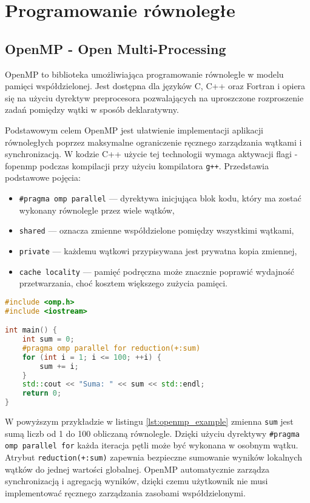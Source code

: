 \section{Programowanie równoległe}
\subsection{OpenMP -  Open Multi-Processing}
OpenMP to biblioteka umożliwiająca programowanie równoległe w modelu pamięci współdzielonej. Jest dostępna dla języków C, C++ oraz Fortran i opiera się na użyciu dyrektyw preprocesora pozwalających na uproszczone rozproszenie zadań pomiędzy wątki w sposób deklaratywny.

Podstawowym celem OpenMP jest ułatwienie implementacji aplikacji równoległych poprzez maksymalne ograniczenie ręcznego zarządzania wątkami i synchronizacją. W kodzie C++ użycie tej technologii wymaga aktywacji flagi -fopenmp podczas kompilacji przy użyciu kompilatora \texttt{g++}.
Przedstawia podstawowe pojęcia:
\begin{itemize}
    \item \texttt{\#pragma omp parallel} — dyrektywa inicjująca blok kodu, który ma zostać wykonany równolegle przez wiele wątków,
    \item \texttt{shared} — oznacza zmienne współdzielone pomiędzy wszystkimi wątkami,
    \item \texttt{private} — każdemu wątkowi przypisywana jest prywatna kopia zmiennej,
    \item \texttt{cache locality} — pamięć podręczna  może znacznie poprawić wydajność przetwarzania, choć kosztem większego zużycia pamięci.
\end{itemize}

\begin{lstlisting}[language=C++, style=VS2017,  caption={Przykład użycia OpenMP w C++}, label={lst:openmp_example}]
#include <omp.h>
#include <iostream>

int main() {
    int sum = 0;
    #pragma omp parallel for reduction(+:sum)
    for (int i = 1; i <= 100; ++i) {
        sum += i;
    }
    std::cout << "Suma: " << sum << std::endl;
    return 0;
}
\end{lstlisting}    
W powyższym przykładzie w listingu \ref{lst:openmp_example} zmienna \texttt{sum} jest sumą liczb od 1 do 100 obliczaną równolegle. Dzięki użyciu dyrektywy \texttt{\#pragma omp parallel for} każda iteracja pętli może być wykonana w osobnym wątku. Atrybut \texttt{reduction(+:sum)} zapewnia bezpieczne sumowanie wyników lokalnych wątków do jednej wartości globalnej. OpenMP automatycznie zarządza synchronizacją i agregacją wyników, dzięki czemu użytkownik nie musi implementować ręcznego zarządzania zasobami współdzielonymi.

